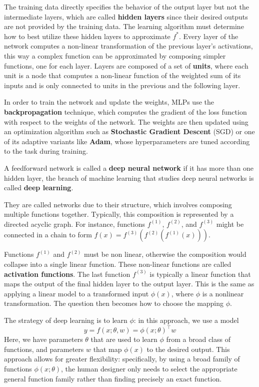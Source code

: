 The training data directly specifies the behavior of the output layer but
not the intermediate layers, which are called \textbf{hidden layers}
since their desired outputs are not provided by the training data.
The learning algorithm must determine how to best utilize these
hidden layers to approximate \( f^* \).
Every layer of the network computes a non-linear transformation of the
previous layer's activations, this way a complex function can be
approximated by composing simpler functions, one for each layer.
Layers are composed of a set of \textbf{units}, where each unit is a node that
computes a non-linear function of the weighted sum of its inputs
and is only connected to units in the previous and the following layer.

In order to train the network and update the weights, MLPs use the
\textbf{backpropagation} technique, which computes the gradient of the
loss function with respect to the weights of the network.
The weights are then updated using an optimization algorithm such as
\textbf{Stochastic Gradient Descent} (SGD)
or one of its adaptive variants like \textbf{Adam},
whose hyperparameters are tuned according to the task during training.

A feedforward network is called a \textbf{deep neural network} if it has
more than one hidden layer, the branch of machine learning that studies
deep neural networks is called \textbf{deep learning}.

They are called networks due to their structure, which involves composing
multiple functions together. Typically, this composition is represented
by a directed acyclic graph. For instance, functions
\( f^{(1)} \), \( f^{(2)} \), and \( f^{(3)} \) might be connected in
a chain to form \( f(x) = f^{(3)}(f^{(2)}(f^{(1)}(x))) \).

Functions \( f^{(1)} \) and \( f^{(2)} \) must
be non linear, otherwise the composition would collapse into a single
linear function. These non-linear functions are
called \textbf{activation functions}.
The last function \( f^{(3)} \) is typically a linear function that maps
the output of the final hidden layer to the output layer.
This is the same as applying a linear model to a transformed
input \( \phi(x) \), where \( \phi \) is a nonlinear transformation.
The question then becomes how to choose the mapping \( \phi \).

The strategy of deep learning is to learn \( \phi \):
in this approach, we use a model
\begin{equation}
y = f(x; \theta, w) = \phi(x; \theta)^\top w
\end{equation}
Here, we have parameters \( \theta \) that are used to learn \( \phi \)
from a broad class of functions, and parameters \( w \) that map \( \phi(x) \)
to the desired output.
This approach allows for greater flexibility:
specifically, by using a broad family of functions
\( \phi(x; \theta) \), the human designer only needs to select the appropriate
general function family rather than finding precisely an exact function.

